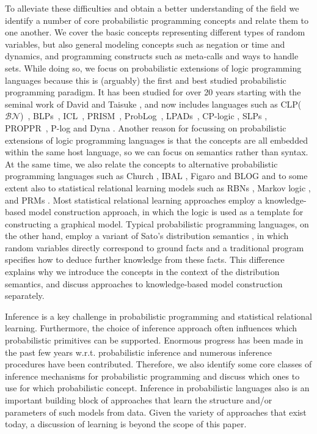 \documentclass[a4paper]{article}
\newcommand{\clpbn}
  {CLP($\mathcal{BN}$)}
\begin{document}
To alleviate these difficulties and obtain a better understanding of the field
we identify a number of core probabilistic programming concepts and
relate them to one another. We cover the basic
concepts representing different types of random variables, but also
general modeling concepts such as negation or time and dynamics, and
programming constructs such as meta-calls and ways to handle sets. 
While doing so, we focus on probabilistic extensions of logic programming languages
because this is (arguably) the first and best studied probabilistic programming paradigm. 
It has been studied for over 20 years starting with the seminal work of David \cite{Poole92} and Taisuke \cite{Sato:95},
and now includes languages such as  \clpbn~\citep{clpbn},
BLPs~\citep{Kersting08}, ICL~\citep{Poole08},
PRISM~\citep{SatoKameya:01}, ProbLog~\citep{DeRaedt07-IJCAIa},
LPADs~\citep{Vennekens04}, 
CP-logic \citep{vennekens:tplp09},  SLPs \citep{Muggleton:96},
PROPPR~\citep{wang:cikm13}, P-log \citep{baral:tplp09} and Dyna \citep{Eisner05}. 
Another reason for focussing on probabilistic extensions of logic programming languages
is that the concepts are all embedded within the same host language, so we can focus on semantics rather than syntax. 
At the same time, we also relate the concepts to alternative
probabilistic programming languages such as Church \citep{Goodman08},
IBAL \citep{Pfeffer01}, Figaro \citep{Pfeffer09} and BLOG \citep{Milch05}
and to some extent also to statistical relational learning models such
as RBNs \citep{Jaeger08}, Markov logic \citep{Richardson:06},
 and PRMs \citep{getoor}.  Most statistical relational learning approaches
employ a knowledge-based model construction approach, in which the
logic is used as a template
for constructing a graphical model. Typical probabilistic programming
languages, on the other hand, employ a variant of Sato's distribution semantics \citep{Sato:95}, in which 
random variables directly correspond to ground facts and a traditional program 
specifies how to deduce further knowledge from these facts. This
difference explains
why we introduce the concepts in the context of the distribution semantics,
and discuss approaches to knowledge-based model construction separately.

Inference is a key challenge in probabilistic programming and
statistical relational learning.  
Furthermore, the choice of inference approach often influences which
probabilistic primitives can be supported. 
Enormous progress has been made in the past few years w.r.t. probabilistic inference and numerous inference procedures have been contributed. 
Therefore, we also identify some core classes of inference mechanisms for probabilistic programming and discuss which 
ones to use for which probabilistic concept. Inference in probabilistic languages also
is an important building block of approaches that learn the structure
and/or parameters of such models from data. Given the variety of
approaches that exist today, a discussion of learning is beyond the
scope of this paper. 
\end{document}
